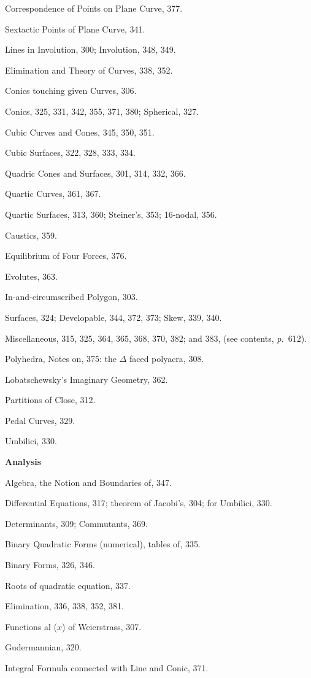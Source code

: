 \documentclass[11pt,a4paper]{article}
\newcommand{\page}{\textit{p.}}
\begin{document}
Correspondence of Points on Plane Curve, 377.

Sextactic Points of Plane Curve, 341.

Lines in Involution, 300; Involution, 348, 349.

Elimination and Theory of Curves, 338, 352.

Conics touching given Curves, 306.

Conics, 325, 331, 342, 355, 371, 380; Spherical, 327.

Cubic Curves and Cones, 345, 350, 351.

Cubic Surfaces, 322, 328, 333, 334.

Quadric Cones and Surfaces, 301, 314, 332, 366.

Quartic Curves, 361, 367.

Quartic Surfaces, 313, 360; Steiner's, 353; 16-nodal, 356.

Caustics, 359.

Equilibrium of Four Forces, 376.

Evolutes, 363.

In-and-circumscribed Polygon, 303.

Surfaces, 324; Developable, 344, 372, 373; Skew, 339, 340.

Miscellaneous, 315, 325, 364, 365, 368, 370, 382; and 383, (see contents, \page~612).

Polyhedra, Notes on, 375: the $\Delta$ faced polyacra, 308.

Lobatschewsky's Imaginary Geometry, 362.

Partitions of Close, 312.

Pedal Curves, 329.

Umbilici, 330.

\medskip
\textbf{Analysis}

Algebra, the Notion and Boundaries of, 347.

Differential Equations, 317; theorem of Jacobi's, 304; for Umbilici, 330.

Determinants, 309; Commutants, 369.

Binary Quadratic Forms (numerical), tables of, 335.

Binary Forms, 326, 346.

Roots of quadratic equation, 337.

Elimination, 336, 338, 352, 381.

Functions al ($x$) of Weierstrass, 307.

Gudermannian, 320.

Integral Formula connected with Line and Conic, 371.
\end{document}
